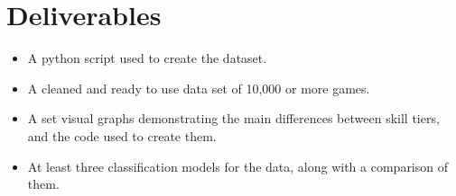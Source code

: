 \documentclass[11pt]{article}
\begin{document}
\section{Deliverables}

\begin{itemize}
\item A python script used to create the dataset.
\item A cleaned and ready to use data set of 10,000 or more games.
\item A set visual graphs demonstrating the main differences between skill tiers, and the code used to create them.
\item At least three classification models for the data, along with a comparison of them.
\end{itemize}
\end{document}
